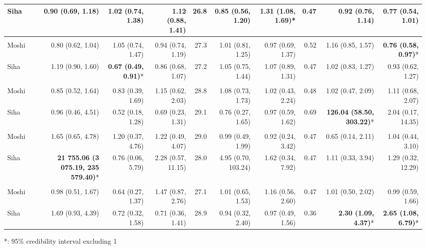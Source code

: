 \begin{table}[t]
\begin{tabular*}{\linewidth}{@{\extracolsep{\fill}}l|rrrrrrrrr}
Siha & 0.90 (0.69, 1.18) & 1.02 (0.74, 1.38) & 1.12 (0.88, 1.41) & 26.8 & 0.85 (0.56, 1.20) & \textbf{1.31 (1.08, 1.69)}* & 0.47 & 0.92 (0.76, 1.14) & 0.77 (0.54, 1.01) \\ 
\midrule\addlinespace[2.5pt]
\multicolumn{10}{l}{Road Traffic Accidents} \\[2.5pt] 
\midrule\addlinespace[2.5pt]
Moshi & 0.80 (0.62, 1.04) & 1.05 (0.74, 1.47) & 0.94 (0.74, 1.19) & 27.3 & 1.01 (0.81, 1.25) & 0.97 (0.69, 1.37) & 0.52 & 1.16 (0.85, 1.57) & \textbf{0.76 (0.58, 0.97)}* \\ 
Siha & 1.19 (0.90, 1.60) & \textbf{0.67 (0.49, 0.91)}* & 0.86 (0.68, 1.07) & 27.2 & 1.05 (0.75, 1.44) & 1.07 (0.89, 1.31) & 0.47 & 1.02 (0.83, 1.27) & 0.93 (0.62, 1.27) \\ 
\midrule\addlinespace[2.5pt]
\multicolumn{10}{l}{Typhoid} \\[2.5pt] 
\midrule\addlinespace[2.5pt]
Moshi & 0.85 (0.52, 1.64) & 0.83 (0.39, 1.69) & 1.15 (0.62, 2.03) & 28.8 & 1.08 (0.73, 1.73) & 1.02 (0.43, 2.24) & 0.48 & 1.02 (0.47, 2.09) & 1.11 (0.68, 2.07) \\ 
Siha & 0.96 (0.46, 4.51) & 0.52 (0.18, 1.28) & 0.69 (0.23, 1.31) & 29.1 & 0.76 (0.27, 1.65) & 0.97 (0.59, 1.62) & 0.69 & \textbf{126.04 (58.50, 303.22)}* & 2.04 (0.17, 14.35) \\ 
\midrule\addlinespace[2.5pt]
\multicolumn{10}{l}{Leprosy} \\[2.5pt] 
\midrule\addlinespace[2.5pt]
Moshi & 1.65 (0.65, 4.78) & 1.20 (0.37, 4.76) & 1.22 (0.49, 4.07) & 29.0 & 0.99 (0.49, 1.99) & 0.92 (0.24, 3.42) & 0.47 & 0.65 (0.14, 2.11) & 1.04 (0.44, 3.10) \\ 
Siha & \textbf{21 755.06 (3 075.19, 235 579.40)}* & 0.76 (0.06, 5.79) & 2.28 (0.57, 11.15) & 28.0 & 4.95 (0.70, 103.24) & 1.62 (0.34, 7.92) & 0.47 & 1.11 (0.33, 3.94) & 1.29 (0.32, 12.29) \\ 
\midrule\addlinespace[2.5pt]
\multicolumn{10}{l}{Schistosomiasis} \\[2.5pt] 
\midrule\addlinespace[2.5pt]
Moshi & 0.98 (0.51, 1.67) & 0.64 (0.27, 1.37) & 1.47 (0.87, 2.76) & 27.1 & 1.01 (0.65, 1.53) & 1.16 (0.56, 2.60) & 0.47 & 1.01 (0.50, 2.02) & 0.99 (0.59, 1.66) \\ 
Siha & 1.69 (0.93, 4.39) & 0.72 (0.32, 1.58) & 0.71 (0.36, 1.41) & 28.9 & 0.94 (0.32, 2.40) & 0.97 (0.49, 1.56) & 0.36 & \textbf{2.30 (1.09, 4.37)}* & \textbf{2.65 (1.08, 6.79)}* \\ 
\bottomrule
\end{tabular*}
\begin{minipage}{\linewidth}
*: 95\% credibility interval excluding 1\\
\end{minipage}
\end{table}

